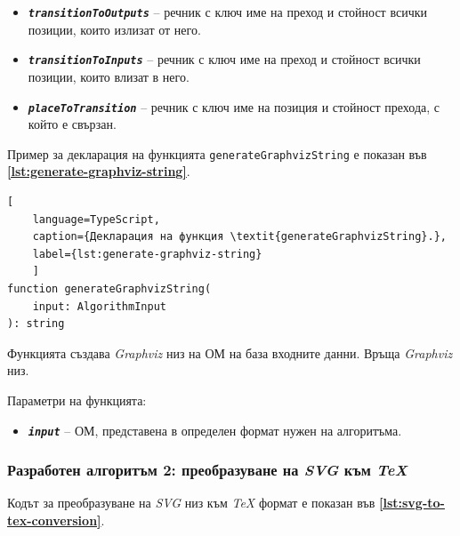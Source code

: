 \begin{itemize}
	\item \texttt{\textbf{\textit{transitionToOutputs}}} -- речник с ключ име на преход и стойност всички позиции, които излизат от него.
	\item \texttt{\textbf{\textit{transitionToInputs}}} -- речник с ключ име на преход и стойност всички позиции, които влизат в него.
	\item \texttt{\textbf{\textit{placeToTransition}}} -- речник с ключ име на позиция и стойност прехода, с който е свързан.
\end{itemize}

\vspace{0.55cm}

Пример за декларация на функцията \texttt{generateGraphvizString} е показан във \textbf{\autoref{lst:generate-graphviz-string}}.
\begin{lstlisting}[
	language=TypeScript,
	caption={Декларация на функция \textit{generateGraphvizString}.},
	label={lst:generate-graphviz-string}
	]
function generateGraphvizString(
    input: AlgorithmInput
): string
\end{lstlisting}

Функцията създава \textit{Graphviz} низ на ОМ на база входните данни. Връща \textit{Graphviz} низ.

Параметри на функцията:

\vspace{-0.3cm}

\begin{itemize}
	\item \texttt{\textbf{\textit{input}}} -- ОМ, представена в определен формат нужен на алгоритъма.
\end{itemize} 

\subsubsection{Разработен алгоритъм 2: преобразуване на \textit{SVG} към \textit{TeX}}

Кодът за преобразуване на \textit{SVG} низ към \textit{TeX} формат е показан във \textbf{\autoref{lst:svg-to-tex-conversion}}.


